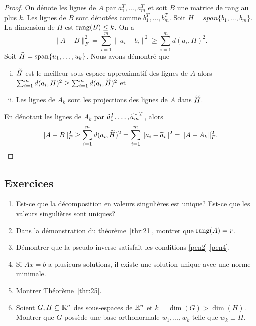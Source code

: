 \begin{proof}
On dénote les lignes de $A$ par $a_1^T,\dots,a_m^T$ et soit $B$ une matrice de rang au plus $k$. Les lignes de $B$ sont dénotées comme $b_1^T,\dots,b_m^T$. Soit $H = span\{b_1,\dots,b_m\}$. La dimension de $H$ est $\operatorname{rang}(B) \leq k$. On a 
\begin{displaymath}
  \|A - B\|_F^2 = \sum_{i=1}^m \|a_i - b_i\|^2 \geq \sum_{i=1}^m d(a_i,H)^2.
\end{displaymath}
Soit $\widetilde{H} = \operatorname{span}\{u_1,\dots,u_k\}$. Nous avons démontré que 
\begin{enumerate}[i)]
\item $\widetilde{H}$ est le meilleur sous-espace approximatif des lignes de $A$ alors $\sum_{i=1}^m d(a_i,H)^2 \geq  \sum_{i=1}^m d(a_i,\widetilde{H})^2$ et 
\item Les lignes de $A_k$ sont les projections des lignes de $A$ dans $\widetilde{H}$. 
\end{enumerate}
En dénotant les lignes de $A_k$ par $\widetilde{a}_1^T,\dots,\widetilde{a_m}^T$, alors 
\begin{displaymath}
  \|A - B\|_F^2 \geq  \sum_{i=1}^m d(a_i,\widetilde{H})^2 = \sum_{i=1}^m \|a_i - \widetilde{a}_i\|^2 = \|A - A_k\|_F^2. 
\end{displaymath}
\end{proof}

\subsection*{Exercices}

\begin{enumerate}
\item Est-ce que la décomposition en valeurs singulières est unique? Est-ce que les valeurs singulières sont uniques?  \label{ts:item:2}
\item  Dans la démonstration du théorème~\ref{thr:21}, montrer que $\operatorname{rang}(A) = r$. 
\item Démontrer que la pseudo-inverse satisfait les conditions \ref{pen2}-\ref{pen4}. 
\item Si $Ax = b$ a plusieurs solutions, il existe une solution unique avec une norme minimale. 
\item Montrer Théorème~\ref{thr:25}. 
\item Soient  $G,H \subseteq \mathbb{R}^n$ des sous-espaces de $\mathbb{R}^n$ 
et $k=\dim(G) > \dim(H)$. Montrer que $G$ possède une base orthonormale $w_1,\dots,w_k$ telle que $w_k \perp H$. \label{s:item:3}  
\end{enumerate}






